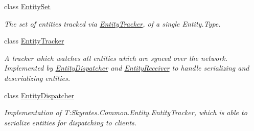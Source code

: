 \begin{DoxyCompactItemize}
class \hyperlink{class_skyrates_1_1_common_1_1_entity_1_1_entity_set}{Entity\-Set}
\begin{DoxyCompactList}\small\item\em The set of entities tracked via \hyperlink{class_skyrates_1_1_common_1_1_entity_1_1_entity_tracker}{Entity\-Tracker}, of a single Entity.\-Type. \end{DoxyCompactList}\item 
class \hyperlink{class_skyrates_1_1_common_1_1_entity_1_1_entity_tracker}{Entity\-Tracker}
\begin{DoxyCompactList}\small\item\em A tracker which watches all entities which are synced over the network. Implemented by \hyperlink{class_skyrates_1_1_common_1_1_entity_1_1_entity_dispatcher}{Entity\-Dispatcher} and \hyperlink{class_skyrates_1_1_common_1_1_entity_1_1_entity_receiver}{Entity\-Receiver} to handle serializing and deserializing entities. \end{DoxyCompactList}\item 
class \hyperlink{class_skyrates_1_1_common_1_1_entity_1_1_entity_dispatcher}{Entity\-Dispatcher}
\begin{DoxyCompactList}\small\item\em Implementation of T\-:\-Skyrates.\-Common.\-Entity.\-Entity\-Tracker, which is able to serialize entities for dispatching to clients. \end{DoxyCompactList}\end{DoxyCompactItemize}
